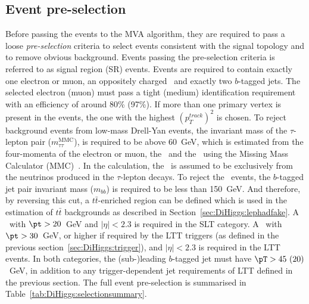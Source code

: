 \subsection{Event pre-selection}

\label{sec:DiHiggs:selection}



Before passing the events to the MVA algorithm, 
they are required to pass a loose \textit{pre-selection} criteria to 
select events consistent with the signal topology and to
remove obvious background.  
Events passing the pre-selection criteria is referred to as
signal region (SR) events. 
Events are required to contain exactly 
one electron or muon, 
an oppositely charged \tauhad\, 
and exactly two $b$-tagged jets.
The selected electron (muon) must pass a 
tight (medium) identification requirement with an efficiency of around 80\% (97\%).
If more than one primary vertex is present in the events, 
the one with the highest $(p_T^{track})^2$ is chosen.
To reject background events from low-mass Drell-Yan events, 
the invariant mass of the $\tau$-lepton pair ($m_{\tau\tau}^\text{MMC}$),
is required to be above 60~GeV,
which is estimated from the four-momenta of the electron or muon, 
the \tauhad\ and the \met\ using the Missing Mass Calculator (MMC)~\cite{Elagin:2010aw}.
In the calculation, the \met\ is assumed to be exclusively from the neutrinos 
produced in the $\tau$-lepton decays. 
To reject the \ttbar\ events, the $b$-tagged jet pair invariant mass ($m_{bb}$) 
is required to be less than 150~GeV. And therefore, by reversing this cut, 
a $t\bar t$-enriched region can be defined  
which is used in the estimation of $t\bar t$ backgrounds
as described in Section~\ref{sec:DiHiggs:lephadfake}. 
A \tauhad\ with $\pt>20$~GeV and 
$\vert\eta\vert<2.3$ is required in the SLT category.
A \tauhad\ with $\pt>30$~GeV,
or higher if required by the LTT triggers (as defined in the previous
section~\ref{sec:DiHiggs:trigger}), 
and $\vert\eta\vert<2.3$ is required in the LTT events. 
In both categories, the (sub-)leading $b$-tagged jet 
must have $\pT>45~(20)$~GeV, 
in addition to any trigger-dependent jet requirements of LTT
defined in the previous section.
The full event pre-selection is summarised in Table~\ref{tab:DiHiggs:selectionsummary}. 

